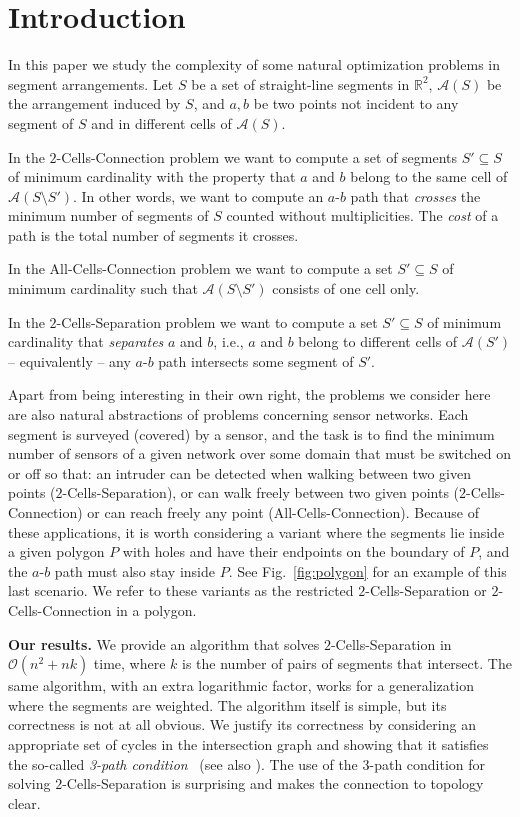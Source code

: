 \documentclass[11pt,a4paper]{article}
\def\Reals{\ensuremath{\mathbb{R}}}
\begin{document}
\section{Introduction}

In this paper we study the complexity of some natural optimization problems in segment arrangements. Let $S$ be a set of straight-line segments in $\Reals^2$, $\mathcal{A}(S)$ be the arrangement induced by $S$, and $a, b$ be two points not incident to any segment of $S$ and in different cells of $\mathcal{A}(S)$.

In the {\sc $2$-Cells-Connection} problem we want to compute a set of segments $S'\subseteq S$ of minimum cardinality with the property that $a$ and $b$ belong to the same cell of $\mathcal{A}(S\setminus S')$. 
In other words, we want to compute 
an $a$-$b$ path that \emph{crosses} the minimum number of segments of $S$ counted without multiplicities.
The \emph{cost} of a path is the total number of segments it crosses.

In the {\sc All-Cells-Connection} problem we want to compute a set $S'\subseteq S$ of minimum cardinality such that $\mathcal{A}(S\setminus S')$ consists of one cell only.

In the {\sc $2$-Cells-Separation} problem we want to compute a set $S'\subseteq S$ of minimum cardinality that \emph{separates} $a$ and $b$, i.e., $a$ and $b$ belong to different cells of $\mathcal{A}(S')$ -- equivalently -- any $a$-$b$ path intersects some segment of $S'$. 

Apart from being interesting in their own right, the problems we consider here are also natural abstractions of problems concerning sensor networks. Each segment is surveyed (covered) by a sensor, and the task is to find the minimum number of sensors of a given network over some domain that must be switched on or off so that: an intruder can be detected when walking between two given points ({\sc $2$-Cells-Separation}), or can walk freely between two given points ({\sc $2$-Cells-Connection}) or can reach freely any point ({\sc All-Cells-Connection}). Because of these applications, it is worth considering a variant where the segments lie inside a given polygon $P$ with holes and have their endpoints on the boundary of $P$, and the $a$-$b$ path must also stay inside $P$. See Fig.~\ref{fig:polygon} for an example of this last scenario. We refer to these variants as the restricted {\sc $2$-Cells-Separation} or {\sc $2$-Cells-Connection} in a polygon.

\medskip
\noindent
{\bf Our results.} We provide an algorithm that solves {\sc $2$-Cells-Separation} in $\mathcal{O}(n^2+nk)$ time, where $k$ is the number of pairs of segments that intersect. The same algorithm, with an extra logarithmic factor, works for a generalization where the segments are weighted. The algorithm itself is simple, but its correctness is not at all obvious. We justify its correctness by considering an appropriate set of cycles in the intersection graph and showing that it satisfies the so-called \emph{3-path condition}~\cite{t-egsnc-90} (see also \cite[Chapter 4]{mt-gs-01}). The use of the 3-path condition for solving {\sc $2$-Cells-Separation} is surprising and makes the connection to topology clear. 
\end{document}
